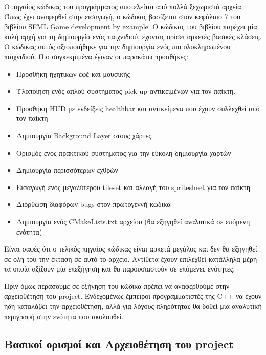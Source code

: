 \documentclass[12pt]{article}
\begin{document}
	Ο πηγαίος κώδικας του προγράμματος αποτελείται από πολλά ξεχωριστά αρχεία. Όπως έχει αναφερθεί στην εισαγωγή, ο κώδικας βασίζεται στον κεφάλαιο 7 του βιβλίου SFML Game development by example. Ο κώδικας του βιβλίου παρέχει μία καλή αρχή για τη δημιουργία ενός παιχνιδιού, έχοντας ορίσει αρκετές βασικές κλάσεις. Ο κώδικας αυτός αξιοποιήθηκε για την δημιουργία ενός πιο ολοκληρωμένου παιχνιδιού. Πιο συγκεκριμένα έγιναν οι παρακάτω προσθήκες:
	
	\begin{itemize}
		\item Προσθήκη ηχητικών εφέ και μουσικής
		
		\item Υλοποίηση ενός απλού συστήματος pick up αντικειμένων για τον παίκτη.
		
		\item Προσθήκη HUD με ενδείξεις healthbar και αντικείμενα που έχουν συλλεχθεί από τον παίκτη
		
		\item Δημιουργία Background Layer στους χάρτες
		
		\item Ορισμός ενός πρακτικού συστήματος για την εύκολη δημιουργία χαρτών
		
		\item Δημιουργία περισσότερων εχθρών
		
		\item Εισαγωγή ενός μεγαλύτερου tileset και αλλαγή του spritesheet για τον παίκτη
		
		\item Διόρθωση διαφόρων bugs στον πρωτογεννή κώδικα
		
		\item Δημιουργία ενός CMakeLists.txt αρχείου (θα εξηγηθεί αναλυτικά σε επόμενη ενότητα)
	\end{itemize}

	Είναι σαφές ότι ο τελικός πηγαίος κώδικας είναι αρκετά μεγάλος και δεν θα εξηγηθεί σε όλη του την έκταση σε αυτό το αρχείο. Αντίθετα έχουν επιλεχθεί κατάλληλα μέρη τα οποία αξίζουν μία επεξήγηση και θα παρουσιαστούν σε επόμενες ενότητες.
	
	Πριν όμως περάσουμε σε εξήγηση του κώδικα πρέπει να αναφερθούμε στην αρχειοθέτηση του project. Ενδεχομένως έμπειροι προγραμματιστές της C++ να έχουν ήδη καταλάβει την αρχειοθέτηση, αλλά για λόγους πληρότητας θα δοθεί μία αναλυτική περιγραφή στην ενότητα που ακολουθεί.
	
	\subsection{Βασικοί ορισμοί και Αρχειοθέτηση του project}
	
\end{document}

